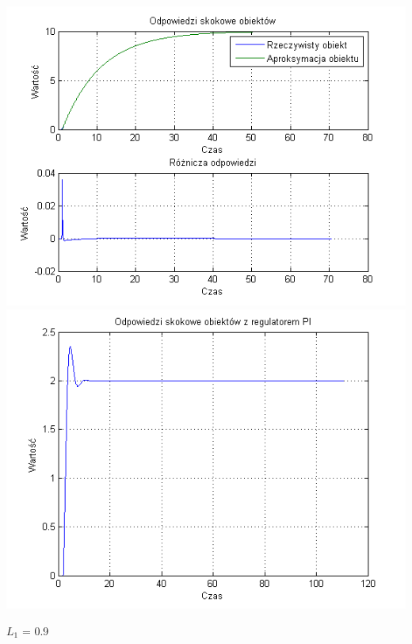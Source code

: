 \documentclass[10pt,a4paper]{article}
\begin{document}
\begin{center}
\includegraphics[scale=1]{images/jeden/skrypt_221.png}\\
\includegraphics[scale=1]{images/jeden/skrypt_222.png}\\
\end{center}
\newpage
$L_1$ = 0.9
\end{document}
